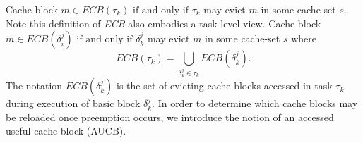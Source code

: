 \noindent Cache block \begin{math}m \in \textit{ECB}(\tau_{k})\textrm{ if and only if }\tau_{k}\end{math} may evict $m$ in some cache-set $s$.  Note this definition of \textit{ECB} also embodies a task level view.  Cache block \begin{math}m \in \textit{ECB}(\delta_{i}^{j})\textrm{ if and only if } \delta_{k}^{j}\end{math} may evict $m$ in some cache-set $s$ where
\begin{equation}\label{eqn:ecb-task}
    \textit{ECB}(\tau_{k}) = \bigcup_{\delta_{k}^{j} \in \tau_{k}} \textit{ECB}(\delta_{k}^{j}).
\end{equation}
\noindent The notation \begin{math}\textit{ECB}(\delta_{k}^{j})\end{math} is the set of evicting cache blocks accessed in task \begin{math}\tau_{k}\end{math} during execution of basic block \begin{math}\delta_{k}^{j}\end{math}.  In order to determine which cache blocks may be reloaded once preemption occurs, we introduce the notion of an accessed useful cache block (AUCB).
%
%
